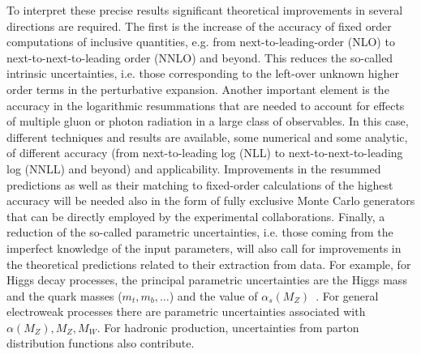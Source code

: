 \documentclass[../report.tex]{subfiles}
\newcommand{\ew}{electroweak\xspace}
\begin{document}
To interpret these precise results significant theoretical improvements  in several directions are required.  The first  is the increase of the accuracy of fixed order computations of inclusive quantities, e.g.  from next-to-leading-order (NLO) to next-to-next-to-leading order (NNLO) and beyond. This reduces the so-called intrinsic uncertainties, i.e. those corresponding to the left-over unknown higher order terms in the perturbative expansion. Another important element is the accuracy in the logarithmic resummations that are needed to account for effects of multiple gluon or photon radiation in a large class of observables. In this case, different techniques and results are available, some numerical and some analytic, of different accuracy (from next-to-leading log (NLL) to next-to-next-to-leading log (NNLL) and beyond) and applicability. Improvements in the resummed predictions as well as their matching to fixed-order calculations of the highest accuracy will be needed also in the form of fully exclusive Monte Carlo generators that can be directly employed by the experimental collaborations. Finally, a reduction of the so-called parametric uncertainties, i.e. those coming from the imperfect knowledge of the input parameters, will also call for improvements in the theoretical predictions related to their extraction from data. For example, for Higgs decay processes, the  principal parametric uncertainties are the Higgs mass and the quark masses ($m_t,m_b,\ldots$) and the value of $\alpha_s(M_Z)$~\cite{Lepage:2014fla}. 
For general \ew processes there are parametric uncertainties associated with $\alpha(M_Z),M_Z,M_W$.  For hadronic production, uncertainties from parton distribution functions also contribute.
\end{document}
